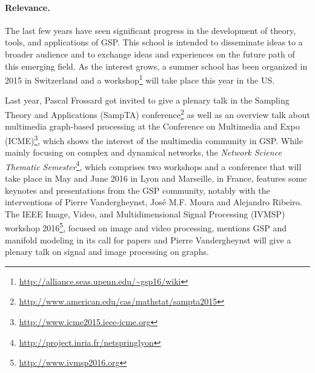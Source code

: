 \documentclass[a4paper]{scrartcl}
\begin{document}
\paragraph{Relevance.}
The last few years have seen significant progress in the development of theory,
tools, and applications of GSP. This school is intended to disseminate ideas to
a broader audience and to exchange ideas and experiences on the future path of
this emerging field. As the interest grows, a summer school has been organized
in 2015 in Switzerland and a
workshop\footnote{\url{http://alliance.seas.upenn.edu/~gsp16/wiki}} will take
place this year in the US.

Last year, Pascal Frossard got invited to give a plenary talk in the Sampling
Theory and Applications (SampTA)
conference\footnote{\url{http://www.american.edu/cas/mathstat/sampta2015}} as
well as an overview talk about multimedia graph-based processing at the
Conference on Multimedia and Expo
(ICME)\footnote{\url{http://www.icme2015.ieee-icme.org}}, which shows the
interest of the multimedia community in GSP. While mainly focusing on complex
and dynamical networks, the \textit{Network Science Thematic
Semester}\footnote{\url{http://project.inria.fr/netspringlyon}}, which
comprises two workshops and a conference that will take place in May and June
2016 in Lyon and Marseille, in France, features some keynotes and presentations
from the GSP community, notably with the interventions of Pierre Vandergheynst,
José M.F. Moura and Alejandro Ribeiro. The IEEE Image, Video, and
Multidimensional Signal Processing (IVMSP) workshop
2016\footnote{\url{http://www.ivmsp2016.org}}, focused on image and video
processing, mentions GSP and manifold modeling in its call for papers and Pierre
Vandergheynst will give a plenary talk on signal and image processing on graphs.

\end{document}
